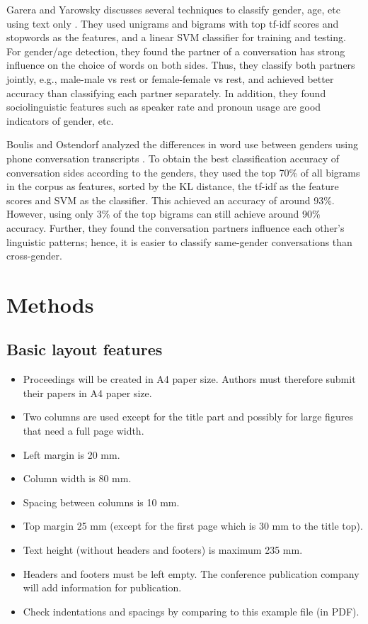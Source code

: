 \documentclass[a4paper]{article}
\begin{document}
Garera and Yarowsky discusses several techniques to classify gender, age, etc using text only \cite{garera}. They used unigrams and bigrams with top tf-idf scores and stopwords as the features, and a linear SVM classifier for training and testing. For gender/age detection, they found the partner of a conversation has strong influence on the choice of words on both sides. Thus, they classify both partners jointly, e.g., male-male vs rest or female-female vs rest, and achieved better accuracy than classifying each partner separately. In addition, they found sociolinguistic features such as speaker rate and pronoun usage are good indicators of gender, etc.

Boulis and Ostendorf analyzed the differences in word use between genders using phone conversation transcripts \cite{boulis}. To obtain the best classification accuracy of conversation sides according to the genders, they used the top 70\% of all bigrams in the corpus as features, sorted by the KL distance, the tf-idf as the feature scores and SVM as the classifier. This achieved an accuracy of around 93\%. However, using only 3\% of the top bigrams can still achieve around 90\% accuracy. Further, they found the conversation partners influence each other's linguistic patterns; hence, it is easier to classify same-gender conversations than cross-gender. 

\section{Methods}

\subsection{Basic layout features}
\begin{itemize}
\item Proceedings will be created in A4 paper size.
Authors must therefore submit their papers in A4 paper size.
\item Two columns are used except for the title part and possibly for large 
figures that need a full page width.
\item Left margin is 20 mm.
\item Column width is 80 mm.
\item Spacing between columns is 10 mm.
\item Top margin 25 mm (except for the first page which is 30 mm to the title top).
\item Text height (without headers and footers) is maximum 235 mm.
\item Headers and footers must be left empty.
The conference publication company will add information for publication.
\item Check indentations and spacings by comparing to this 
example file (in PDF).
\end{itemize}
\end{document}
